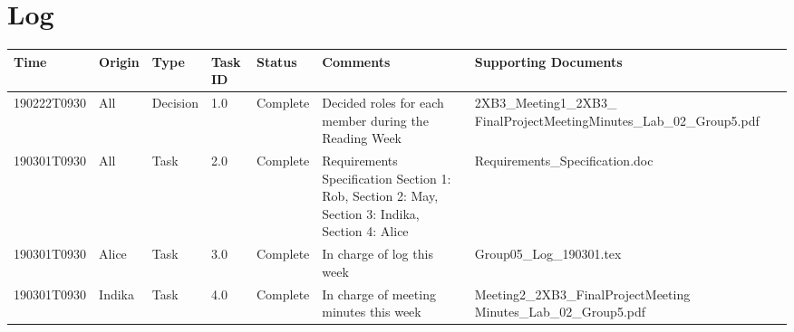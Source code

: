 \documentclass[10pt]{article}
\begin{document}
\section{Log}
 \begin{tabular}{|p{2cm}| p{1cm}| p{2cm}| p{1cm}| p{1.5cm}| p{4cm}| p{5cm}|} 
 \hline
Time & Origin & Type & Task ID & Status & Comments & Supporting Documents   \\  
 \hline
 190222T0930& All & Decision & 1.0 & Complete & Decided roles for each member during the Reading Week & 2XB3\_Meeting1\_2XB3\_ FinalProjectMeetingMinutes\_Lab\_02\_Group5.pdf  \\
 \hline
  190301T0930 & All & Task & 2.0 & Complete & Requirements Specification Section 1: Rob, Section 2: May, Section 3: Indika, Section 4: Alice  & Requirements\_Specification.doc \\ \hline
  190301T0930  & Alice & Task & 3.0 & Complete & In charge of log this week &  Group05\_Log\_190301.tex \\
 
 \hline
  190301T0930 & Indika& Task & 4.0 & Complete & In charge of meeting minutes this week & Meeting2\_2XB3\_FinalProjectMeeting Minutes\_Lab\_02\_Group5.pdf  \\
 \hline


\end{tabular}
\end{document}
